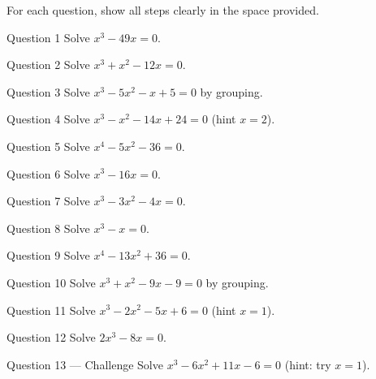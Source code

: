 \documentclass[11pt]{article}
\begin{document}
\clearpage
{}
For each question, show all steps clearly in the space provided.

\begin{qbox}{Question 1}
Solve $x^3-49x=0$.\workspace{2.4cm}
\end{qbox}

\begin{qbox}{Question 2}
Solve $x^3+x^2-12x=0$.\workspace{2.4cm}
\end{qbox}

\begin{qbox}{Question 3}
Solve $x^3-5x^2-x+5=0$ by grouping.\workspace{2.4cm}
\end{qbox}

\begin{qbox}{Question 4}
Solve $x^3-x^2-14x+24=0$ (hint $x=2$).\workspace{2.4cm}
\end{qbox}

\begin{qbox}{Question 5}
Solve $x^4-5x^2-36=0$.\workspace{2.4cm}
\end{qbox}

\begin{qbox}{Question 6}
Solve $x^3-16x=0$.\workspace{2.4cm}
\end{qbox}

\begin{qbox}{Question 7}
Solve $x^3-3x^2-4x=0$.\workspace{2.4cm}
\end{qbox}

\begin{qbox}{Question 8}
Solve $x^3-x=0$.\workspace{2.4cm}
\end{qbox}

\begin{qbox}{Question 9}
Solve $x^4-13x^2+36=0$.\workspace{2.4cm}
\end{qbox}

\begin{qbox}{Question 10}
Solve $x^3+x^2-9x-9=0$ by grouping.\workspace{2.4cm}
\end{qbox}

\begin{qbox}{Question 11}
Solve $x^3-2x^2-5x+6=0$ (hint $x=1$).\workspace{2.4cm}
\end{qbox}

\begin{qbox}{Question 12}
Solve $2x^3-8x=0$.\workspace{2.4cm}
\end{qbox}

\begin{qbox}{Question 13 --- Challenge}
Solve $x^3-6x^2+11x-6=0$ (hint: try $x=1$).\workspace{3.5cm}
\end{qbox}
\end{document}
